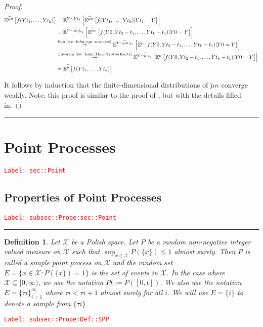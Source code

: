 \documentclass[12pt]{article}
\newcommand{\mb}{\mathbb}
\newcommand{\mc}{\mathcal}
\newcommand{\ra}{\rightarrow}
\newcommand{\os}{\overset}
\newcommand{\te}{\text}
\newcommand{\tr}{\textcolor{red}}
\newcommand{\labe}[1]{\tr{\texttt{Label: #1}}}
\newcommand{\lin}{\rule{\linewidth}{0.4 pt}}
\newcommand{\exmu}[2]{\mb{E}^{#1}\left[#2\right]}	%
\newcommand{\x}{x}								%
\renewcommand{\t}{t}							%
\newcommand{\alt}[1]{\widetilde{#1}}			%
\newcommand{\indx}[1]{_{#1}}					%
\newcommand{\m}{\mu}							%
\newcommand{\XX}{Y}								%
\newcommand{\rt}{\tau}							%
\renewcommand{\it}{k}							%
\newcommand{\rp}{P}								%
\newcommand{\spce}{\mc{X}}						%
\newcommand{\evs}{E}							%
\newtheorem{defn}[thms]{Definition}
\begin{document}
\begin{proof}
\begin{align*}
\exmu{\alt{\m}{n}}{f(\XX{}{\t\indx{1}},\dots,\XX{}{\t\indx{\it}})}&= \exmu{\XX\sim \XX{}{\t\indx{1}}}{\exmu{\alt{\m}{n}}{f(\XX{}{\t\indx{1}},\dots,\XX{}{\t\indx{\it}})|\XX{}{\t\indx{1}}=\XX}}\\
&=\exmu{\XX\sim \alt{\m}{n}|_{\t\indx{1}}}{\exmu{\alt{\m}{n}}{f(\XX{}{0},\XX{\t\indx{2}-\t\indx{1}},\dots,\XX{\t\indx{\it}-\t\indx{1}})|\XX{}{0}=\XX}}\\
&\os{\te{Eqn \eqref{sec::Infin:eqn::zerocase}}}{\ra} \exmu{\XX\sim \alt{\m}{n}|_{\t\indx{1}}}{\exmu{\m}{f(\XX{}{0},\XX{\t\indx{2}-\t\indx{1}},\dots,\XX{\t\indx{\it}-\t\indx{1}})|\XX{}{0}=\XX}}\\
&\os{\te{Theorem \ref{sec::Infin:Thm::TrotterKurtz}}}{\ra} \exmu{\XX\sim \alt{\m}|_{\t\indx{1}}}{\exmu{\m}{f(\XX{}{0},\XX{\t\indx{2}-\t\indx{1}},\dots,\XX{\t\indx{\it}-\t\indx{1}})|\XX{}{0}=\XX}}\\
&=\exmu{\alt{\m}}{f(\XX{}{\t\indx{1}},\dots,\XX{}{\t\indx{\it}})}
\end{align*}

It follows by induction that the finite-dimensional distributions of \(\alt{\m}{n}\) converge weakly. Note: this proof is similar to the proof of \cite[Theorem 4.2]{Kur81}, but with the details filled in.
\end{proof}

\lin 

\section{Point Processes}
\label{sec::Point}\labe{sec::Point}

\subsection{Properties of Point Processes}
\label{subsec::Prope:sec::Point}\labe{subsec::Prope:sec::Point}

\lin

\begin{defn}
Let \(\spce\) be a Polish space. Let \(\rp\) be a random non-negative integer valued measure on \(\spce\) such that \(\sup_{\x \in \spce} \rp(\{\x\})\leq 1\) almost surely. Then \(\rp\) is called a simple point process on \(\spce\) and the random set \(E = \{\x \in \spce: \rp(\{\x\}) = 1\}\) is the set of events in \(\spce\). In the case where \(\spce \subseteq [0,\infty)\), we use the notation \(\rp{\t} := \rp([0,\t])\). We also use the notation \(\evs = \{\rt{i}\}_{i=1}^{\infty}\) where \(\rt{i} < \rt{i+1}\) almost surely for all \(i\). We will use \(\evs = \{	{i}\}\) to denote a sample from \(\{\rt{i}\}\).
\label{subsec::Prope:Def::SPP}
\end{defn}
\labe{subsec::Prope:Def::SPP}
\end{document}
